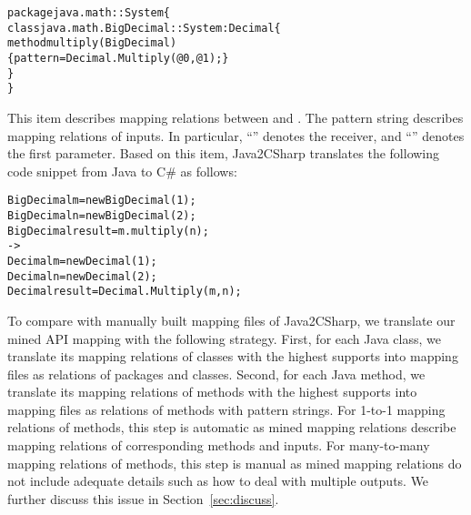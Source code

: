 \begin{CodeOut}\vspace*{-1ex}
\begin{alltt}
package java.math :: System \{
  class java.math.BigDecimal :: System:Decimal \{
    method multiply(BigDecimal)
       \{ pattern =  Decimal.Multiply(@0, @1); \}
  \}
\}
\end{alltt}
\end{CodeOut}\vspace*{-1ex}

This item describes mapping relations between  and . The
pattern string describes mapping relations of inputs. In particular,
``'' denotes the receiver, and ``'' denotes
the first parameter. Based on this item, Java2CSharp translates the
following code snippet from Java to C\# as follows:

\begin{CodeOut}\vspace*{-1ex}
\begin{alltt}
  BigDecimal m = new BigDecimal(1);
  BigDecimal n = new BigDecimal(2);
  BigDecimal result = m.multiply(n);
  ->
  Decimal m = new Decimal(1);
  Decimal n = new Decimal(2);
  Decimal result = Decimal.Multiply(m,n);
\end{alltt}
\end{CodeOut}\vspace*{-1ex}

To compare with manually built mapping files of Java2CSharp, we
translate our mined API mapping with the following strategy. First,
for each Java class, we translate its mapping relations of classes
with the highest supports into mapping files as relations of
packages and classes. Second, for each Java method, we translate its
mapping relations of methods with the highest supports into mapping
files as relations of methods with pattern strings. For 1-to-1
mapping relations of methods, this step is automatic as mined
mapping relations describe mapping relations of corresponding
methods and inputs. For many-to-many mapping relations of methods,
this step is manual as mined mapping relations do not include
adequate details such as how to deal with multiple outputs. We
further discuss this issue in Section~\ref{sec:discuss}.


